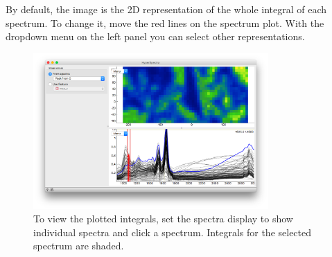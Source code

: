 By default, the image is the 2D representation of the whole integral of each spectrum. To change  it, move the red lines on the spectrum plot. With the dropdown menu on the left panel you can select other representations.

\begin{figure}[h]
    \centering
    \includegraphics[width=0.8\textwidth]{graphics/ch-hyper_basic/hyperspectral-fig3.png}
    \caption{To view the plotted integrals, set the spectra display to show individual spectra and click a spectrum. Integrals for the selected spectrum are shaded.}
    \label{fig:hyper_basic-fig3}
\end{figure}
